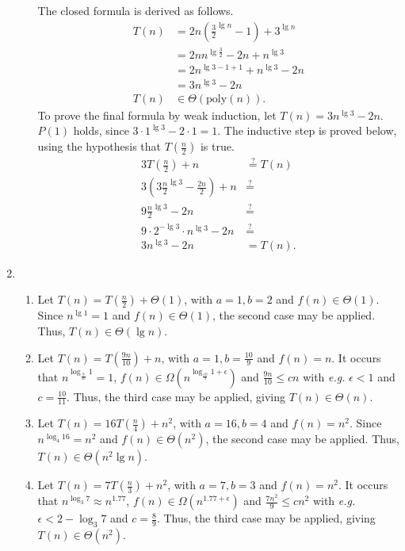 \documentclass[12pt]{article}
\begin{document}
\begin{enumerate}
\begin{enumerate}
    The closed formula is derived as follows.
    \begin{align*}
      T(n) &= 2n(\tfrac{3}{2}^{\lg n} - 1) + 3^{\lg n} \\
      &= 2nn^{\lg \tfrac{3}{2}} - 2n + n^{\lg 3} \\
      &= 2n^{\lg 3 - 1 + 1} + n^{\lg 3} - 2n \\
      &= 3n^{\lg 3} - 2n \\
      T(n) &\in \Theta(\text{poly}(n)).
    \end{align*}
    To prove the final formula by weak induction, let $T(n) = 3n^{\lg 3} - 2n$. $P(1)$ holds, since $3 \cdot 1^{\lg 3} - 2 \cdot 1 = 1$. The inductive step is proved below, using the hypothesis that $T(\frac{n}{2})$ is true.
    \begin{align*}
      3T(\tfrac{n}{2}) + n &\stackrel{?}{=} T(n) \\
      3(3\tfrac{n}{2}^{\lg 3} - \tfrac{2n}{2}) + n &\stackrel{?}{=} \\
      9\tfrac{n}{2}^{\lg 3} - 2n &\stackrel{?}{=} \\
      9 \cdot 2^{-\lg 3} \cdot n^{\lg 3} - 2n &\stackrel{?}{=} \\
      3n^{\lg 3} - 2n &= T(n).
    \end{align*}
  \end{enumerate}
  \item
  \begin{enumerate}
    \item Let $T(n) = T(\frac{n}{2}) + \Theta(1)$, with $a = 1, b = 2$ and $f(n) \in \Theta(1)$. Since $n^{\lg 1} = 1$ and $f(n) \in \Theta(1)$, the second case may be applied. Thus, $T(n) \in \Theta(\lg n)$.
    \item Let $T(n) = T(\frac{9n}{10}) + n$, with $a = 1, b = \frac{10}{9}$ and $f(n) = n$. It occurs that $n^{\log_{\frac{9}{10}} 1} = 1$, $f(n) \in \Omega(n^{\log_{\frac{10}{9}} 1 + \epsilon})$ and $\frac{9n}{10} \leq cn$ with \emph{e.g.} $\epsilon < 1$ and $c = \frac{10}{11}$. Thus, the third case may be applied, giving $T(n) \in \Theta(n)$.
    \item Let $T(n) = 16T(\frac{n}{4}) + n^{2}$, with $a = 16, b = 4$ and $f(n) = n^{2}$. Since $n^{\log_{4} 16} = n^{2}$ and $f(n) \in \Theta(n^{2})$, the second case may be applied. Thus, $T(n) \in \Theta(n^{2} \lg n)$.
    \item Let $T(n) = 7T(\frac{n}{3}) + n^{2}$, with $a = 7, b = 3$ and $f(n) = n^{2}$. It occurs that $n^{\log_{3} 7} \approx n^{1.77}$, $f(n) \in \Omega(n^{1.77 + \epsilon})$ and $\frac{7n^{2}}{9} \leq cn^{2}$ with \emph{e.g.} $\epsilon < 2 - \log_3 7$ and $c = \frac{8}{9}$. Thus, the third case may be applied, giving $T(n) \in \Theta(n^{2})$.

\end{enumerate}
\end{enumerate}
\end{document}
